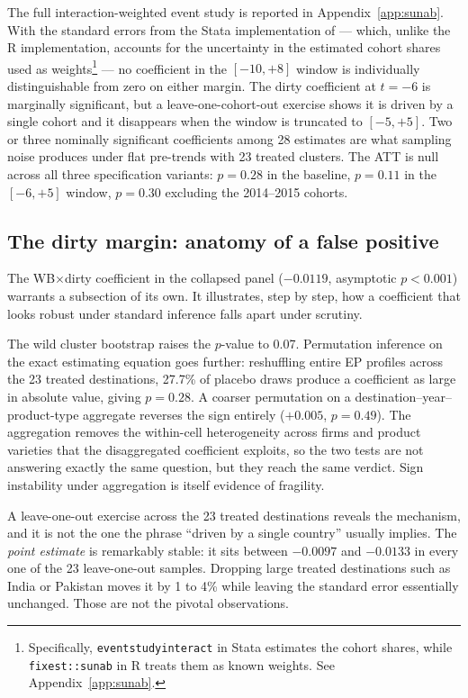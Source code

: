 \documentclass[12pt]{article}
\begin{document}
The full interaction-weighted event study is reported in Appendix~\ref{app:sunab}. With
the standard errors from the Stata implementation of \citet{sun2021} --- which, unlike
the R implementation, accounts for the uncertainty in the estimated cohort shares used
as weights\footnote{Specifically, \texttt{eventstudyinteract} in Stata estimates the
cohort shares, while \texttt{fixest::sunab} in R treats them as known weights. See
Appendix~\ref{app:sunab}.} --- no coefficient in the $[-10, +8]$ window is individually distinguishable
from zero on either margin. The dirty coefficient at $t = -6$ is marginally significant,
but a leave-one-cohort-out exercise shows it is driven by a single cohort and it
disappears when the window is truncated to $[-5, +5]$. Two or three nominally significant
coefficients among 28 estimates are what sampling noise produces under flat pre-trends
with 23 treated clusters. The ATT is null across all three specification variants: $p = 0.28$ in
the baseline, $p = 0.11$ in the $[-6, +5]$ window, $p = 0.30$ excluding the 2014--2015
cohorts.

\subsection{The dirty margin: anatomy of a false positive}\label{sec:dirty}

The WB$\times$dirty coefficient in the collapsed panel ($-0.0119$, asymptotic $p < 0.001$)
warrants a subsection of its own. It illustrates, step by step, how a coefficient that
looks robust under standard inference falls apart under scrutiny.

The wild cluster bootstrap raises the $p$-value to 0.07. Permutation inference on the
exact estimating equation goes further: reshuffling entire EP profiles across the 23
treated destinations, 27.7\% of placebo draws produce a coefficient as large in absolute
value, giving $p = 0.28$. A coarser permutation on a destination--year--product-type
aggregate reverses the sign entirely ($+0.005$, $p = 0.49$). The aggregation removes the
within-cell heterogeneity across firms and product varieties that the disaggregated
coefficient exploits, so the two tests are not answering exactly the same question, but
they reach the same verdict. Sign instability under aggregation is itself evidence of
fragility.

A leave-one-out exercise across the 23 treated destinations reveals the mechanism, and it
is not the one the phrase ``driven by a single country'' usually implies. The
\emph{point estimate} is remarkably stable: it sits between $-0.0097$ and $-0.0133$ in
every one of the 23 leave-one-out samples. Dropping large treated destinations such as
India or Pakistan moves it by 1 to 4\% while leaving the standard error essentially
unchanged. Those are not the pivotal observations.
\end{document}
